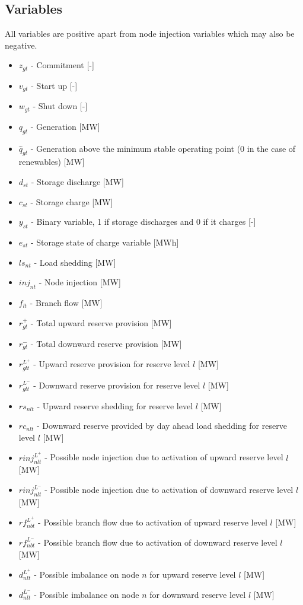 \documentclass[number,times]{elsarticle}
\begin{document}
\subsection{Variables}

All variables are positive apart from node injection variables which may also be negative.

\begin{itemize}
    \item $z_{gt}$ - Commitment [-]
    \item $v_{gt}$ - Start up [-]
    \item $w_{gt}$ - Shut down [-]
    \item $q_{gt}$ - Generation [MW]
    \item $\hat{q}_{gt}$ - Generation above the minimum stable operating point (0 in the case of renewables) [MW]
    \item $d_{st}$ - Storage discharge [MW]
    \item $c_{st}$ - Storage charge [MW]
    \item $y_{st}$ - Binary variable, 1 if storage discharges and 0 if it charges [-]
    \item $e_{st}$ - Storage state of charge variable [MWh]
    \item $ls_{nt}$ - Load shedding [MW]
    \item $inj_{nt}$ - Node injection [MW]
    \item $f_{lt}$ - Branch flow [MW]
    \item $r^+_{gt}$ - Total upward reserve provision [MW]
    \item $r^-_{gt}$ - Total downward reserve provision [MW]
    \item $r^{L^+}_{glt}$ - Upward reserve provision for reserve level $l$ [MW]
    \item $r^{L^-}_{glt}$ - Downward reserve provision for reserve level $l$ [MW]
    \item $rs_{nlt}$ - Upward reserve shedding for reserve level $l$ [MW]
    \item $rc_{nlt}$ - Downward reserve provided by day ahead load shedding for reserve level $l$ [MW]
    \item $rinj_{nlt}^{L^+}$ - Possible node injection due to activation of upward reserve level $l$ [MW]
    \item $rinj_{nlt}^{L^-}$ - Possible node injection due to activation of downward reserve level $l$ [MW]
    \item $rf_{nbt}^{L^+}$ - Possible branch flow due to activation of upward reserve level $l$ [MW]
    \item $rf_{nbt}^{L^-}$ - Possible branch flow due to activation of downward reserve level $l$ [MW]
    \item $d_{nlt}^{L^+}$ - Possible imbalance on node $n$ for upward reserve level $l$ [MW]
    \item $d_{nlt}^{L^-}$ - Possible imbalance on node $n$ for downward reserve level $l$ [MW]
\end{itemize}
\end{document}
